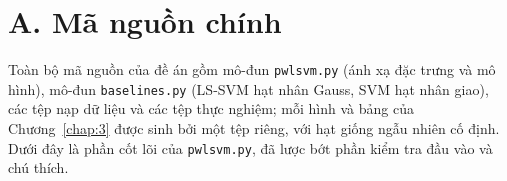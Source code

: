 \setcounter{table}{0}

\section*{A. Mã nguồn chính}

Toàn bộ mã nguồn của đề án gồm mô-đun \texttt{pwlsvm.py} (ánh xạ đặc trưng và mô hình), mô-đun \texttt{baselines.py} (LS-SVM hạt nhân Gauss, SVM hạt nhân giao), các tệp nạp dữ liệu và các tệp thực nghiệm; mỗi hình và bảng của Chương~\ref{chap:3} được sinh bởi một tệp riêng, với hạt giống ngẫu nhiên cố định. Dưới đây là phần cốt lõi của \texttt{pwlsvm.py}, đã lược bớt phần kiểm tra đầu vào và chú thích.

